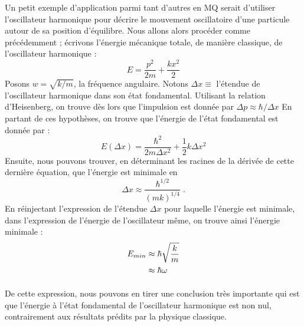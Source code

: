 \documentclass[../Notes de cours]{subfiles}
\begin{document}
Un petit exemple d'application parmi tant d'autres en MQ serait d'utiliser l'oscillateur harmonique pour décrire le mouvement oscillatoire d'une particule autour de sa position d'équilibre. Nous allons alors procéder comme précédemment ; écrivons l'énergie mécanique totale, de manière classique, de l'oscillateur harmonique : \begin{equation}
    \label{Energie OHC}
    E = \frac{p^2}{2m} + \frac{kx^2}{2}
\end{equation}
Posons $w = \sqrt{k/m}$, la fréquence angulaire. 
\newline Notons $\Delta x \equiv$ l'étendue de l'oscillateur harmonique dans son état fondamental. 
\newline Utilisant la relation d'Heisenberg, on trouve dès lors que l'impulsion est donnée par $\Delta p \approx \hbar/\Delta x$
\newline En partant de ces hypothèses, on trouve que l'énergie de l'état fondamental est donnée par : 
\begin{equation}
E \left(\Delta x \right) = \frac{\hbar^2}{2m\Delta x^2} + \frac{1}{2} k \Delta x^2
\end{equation}
Ensuite, nous pouvons trouver, en déterminant les racines de la dérivée de cette dernière équation, que l'énergie est minimale en $$\Delta x \approx \frac{\hbar^{1/2}}{\left(mk\right)^{1/4}}\; .$$ 
En réinjectant l'expression de l'étendue $\Delta x$ pour laquelle l'énergie est minimale, dans l'expression de l'énergie de l'oscillateur même, on trouve ainsi l'énergie minimale : 
\begin{align}
\label{Energie OH}
E_{min} &\approx \hbar \sqrt{\frac{k}{m}} \notag \\
& \approx \hbar \omega 
\end{align}

\paragraph{} De cette expression, nous pouvons en tirer une conclusion très importante qui est que l'énergie à l'état fondamental de l'oscillateur harmonique est non nul, contrairement aux résultats prédits par la physique classique. 
\end{document}
